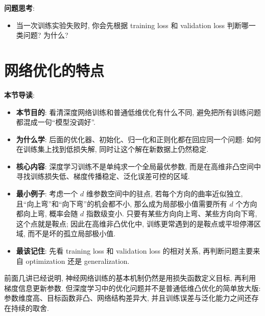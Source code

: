 \documentclass{../nndlcourse}
\begin{document}
\textbf{问题思考}:
\begin{itemize}
  \item 当一次训练实验失败时, 你会先根据 training loss 和 validation loss 判断哪一类问题? 为什么?
\end{itemize}

\section{网络优化的特点}

\textbf{本节导读}:
\begin{itemize}
  \item \textbf{本节目的}: 看清深度网络训练和普通低维优化有什么不同, 避免把所有训练问题都混成一句“模型没调好”.
  \item \textbf{为什么学}: 后面的优化器、初始化、归一化和正则化都在回应同一个问题: 如何在训练集上找到低损失解, 同时让这个解在新数据上仍然稳定.
  \item \textbf{核心内容}: 深度学习训练不是单纯求一个全局最优参数, 而是在高维非凸空间中寻找训练损失低、梯度传播稳定、泛化误差可控的区域.
  \item \textbf{最小例子}: 考虑一个 $d$ 维参数空间中的驻点, 若每个方向的曲率近似独立, 且“向上弯”和“向下弯”的机会都不小, 那么成为局部极小值需要所有 $d$ 个方向都向上弯, 概率会随 $d$ 指数级变小. 只要有某些方向向上弯、某些方向向下弯, 这个点就是鞍点; 因此在高维非凸优化中, 训练更常遇到的是鞍点或平坦停滞区域, 而不是坏的孤立局部极小值.
  \item \textbf{最该记住}: 先看 training loss 和 validation loss 的相对关系, 再判断问题主要来自 optimization 还是 generalization.
\end{itemize}

前面几讲已经说明, 神经网络训练的基本机制仍然是用损失函数定义目标, 再利用梯度信息更新参数. 但深度学习中的优化问题并不是普通低维凸优化的简单放大版: 参数维度高、目标函数非凸、网络结构差异大, 并且训练误差与泛化能力之间还存在持续的取舍.
\end{document}
